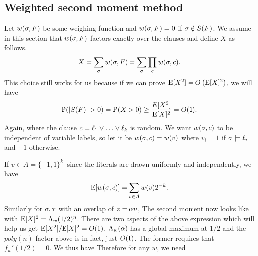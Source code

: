 \documentclass[letterpaper, 10pt, twocolumn, reqno]{amsart}
\begin{document}
\subsection{Weighted second moment method}
\label{ssec:ksat_weighted}
Let $w(\sigma,F)$ be some weighing function and $w(\sigma,F) = 0$ if $\sigma \notin S(F)$. We assume in this section that $w(\sigma,F)$ factors exactly over the clauses and define $X$ as follows.
$$X = \sum_\sigma w(\sigma,F) = \sum_\sigma \prod_c w(\sigma,c).$$
This choice still works for us because if we can prove $\textrm{E}[X^2] = O\left(\textrm{E}[X]^2\right)$, we will have
$$\textrm{P}(\left| S(F) \right| > 0) = \textrm{P}(X > 0) \geq \frac{E[X^2]}{\textrm{E}[X]^2} = O(1).$$
Again,
where the clause $c = \ell_1 \vee \ldots \vee \ell_k$ is random. We want $w(\sigma,c)$ to be independent of variable labels, so let it be $w(\sigma,c) = w(v)$ where $v_i =1$ if $\sigma \models \ell_i$ and $-1$ otherwise.

If $v \in A = \{-1,1\}^k$, since the literals are drawn uniformly and independently, we have
$$
\textrm{E}[w(\sigma,c)] = \sum_{v \in A} w(v) 2^{-k}.
$$
Similarly for $\sigma, \tau$ with an overlap of $z =\alpha n$,
The second moment now looks like
with $\textrm{E}[X]^2 = \Lambda_w(1/2)^n$. There are two aspects of the above expression which will help us get $\textrm{E}[X^2]/\textrm{E}[X]^2 = O(1)$. $\Lambda_w(\alpha)$ has a global maximum at $1/2$ and the $poly(n)$ factor above is in fact, just $O(1)$. The former requires that $f_w'(1/2) =0$. We thus have
Therefore for any $w$, we need
\end{document}
